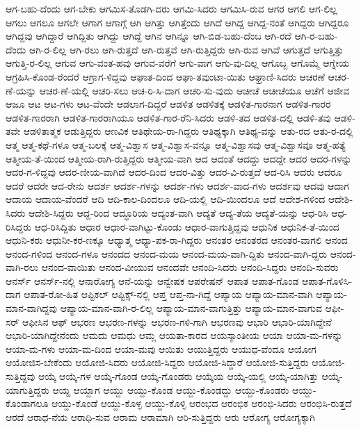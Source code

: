 {ಆಗ-ಬಹು-ದೆಂದು
ಆಗ-ಬೇಕು
ಆಗಮಿಸ-ತೊಡಗಿ-ದರು
ಆಗಮಿ-ಸಿದರು
ಆಗಮಿಸಿ-ರುವ
ಆಗರ
ಆಗಲಿ
ಆಗ-ಲಿಲ್ಲ
ಆಗಲು
ಆಗಲೂ
ಆಗಲೇ
ಆಗಾಗ
ಆಗಾಗ್ಗೆ
ಆಗಿ
ಆಗಿತ್ತು
ಆಗಿತ್ತೆಂದು
ಆಗಿದೆ
ಆಗಿದ್ದ
ಆಗಿದ್ದ-ನಂತೆ
ಆಗಿದ್ದರು
ಆಗಿದ್ದರೂ
ಆಗಿದ್ದವು
ಆಗಿದ್ದಾರೆ
ಆಗಿದ್ದಿತು
ಆಗಿದ್ದು
ಆಗಿದ್ದೆ
ಆಗಿನ
ಆಗಿನ್ನೂ
ಆಗಿ-ಬಿಡ-ಬಹು-ದೆಂಬ
ಆಗಿ-ರದೆ
ಆಗಿ-ರ-ಬಹು-ದೆಂದು
ಆಗಿ-ರ-ಲಿಲ್ಲ
ಆಗಿ-ರಲು
ಆಗಿ-ರುತ್ತದೆ
ಆಗಿ-ರುತ್ತವೆ
ಆಗಿ-ರುತ್ತಿದ್ದರು
ಆಗಿ-ರುವ
ಆಗಿವೆ
ಆಗುತ್ತದೆ
ಆಗುತ್ತಿತ್ತು
ಆಗುತ್ತಿ-ರ-ಲಿಲ್ಲ
ಆಗುವ
ಆಗು-ವಂತ-ಹವು
ಆಗುವ-ವರೆಗೆ
ಆಗು-ವಾಗ
ಆಗು-ವು-ದಿಲ್ಲ
ಆಗೊಬ್ಬ
ಆಗೊಮ್ಮೆ
ಆಗ್ನೇಯ
ಆಗ್ರಹಿಸಿ-ಕೊಂಡ-ರೆಂದರೆ
ಆಗ್ರಾಗ-ಳಿದ್ದವು
ಆಘಾತ-ದಿಂದ
ಆಘಾ-ತವುಂಟಾ-ಯಿತು
ಆಘ್ರಾಣಿ-ಸಿದರು
ಆಚರಣೆ
ಆಚರ-ಣೆ-ಯನ್ನು
ಆಚರ-ಣೆ-ಯಲ್ಲಿ
ಆಚರಿ-ಸಲು
ಆಚ-ರಿ-ಸಿ-ದಾಗ
ಆಚರಿ-ಸು-ವುದು
ಆಚೀಚೆ
ಆಚೀಚೆಯೂ
ಆಚೆಗೆ
ಆಜೀವ
ಆಜೂ
ಆಟ
ಆಟ-ಗಳು
ಆಟ-ವೆಂದೇ
ಆಡಲಾಗ-ದಿದ್ದರೆ
ಆಡಳಿತ
ಆಡಳಿತಕ್ಕೆ
ಆಡಳಿತ-ಗಾರನಾಗ
ಆಡಳಿತ-ಗಾರರ
ಆಡಳಿತ-ಗಾರರಾಗಿ
ಆಡಳಿತ-ಗಾರರಾಗಿಯೂ
ಆಡಳಿತ-ಗಾರ-ರೆನಿ-ಸಿದರು
ಆಡಳಿ-ತದ
ಆಡಳಿತ-ದಲ್ಲಿ
ಆಡಳಿ-ತವು
ಆಡಳಿ-ತವೇ
ಆಡಳಿತಾತ್ಮಕ
ಆಡುತ್ತಿದ್ದರು
ಆಣವಿಕ
ಆತಿಥೇಯ-ರಾ-ಗಿದ್ದರು
ಆತಿಥ್ಯಕ್ಕಾಗಿ
ಆತಿಥ್ಯ-ವನ್ನು
ಆತು-ರದ
ಆತು-ರ-ದಲ್ಲಿ
ಆತ್ಮ
ಆತ್ಮ-ಕಥೆ-ಗಳೂ
ಆತ್ಮ-ಬಲಕ್ಕೆ
ಆತ್ಮ-ವಿಶ್ವಾಸ
ಆತ್ಮ-ವಿಶ್ವಾಸ-ವನ್ನೂ
ಆತ್ಮ-ವಿಶ್ವಾಸವು
ಆತ್ಮ-ವಿಶ್ವಾಸವೂ
ಆತ್ಮ-ಹತ್ಯೆ
ಆತ್ಮೀಯ-ತೆ-ಯಿಂದ
ಆತ್ಮೀಯ-ರಾಗಿ-ರುತ್ತಿದ್ದರು
ಆತ್ಮೀಯ-ವಾಗಿ
ಆದ
ಆದಂತೆ
ಆದದ್ದು
ಆದದ್ದೇ
ಆದರ
ಆದರ-ಗಳನ್ನು
ಆದರ-ಗ-ಳಿದ್ದವು
ಆದರ-ಣೀಯ-ವಾಗಿದೆ
ಆದರ-ದಿಂದ
ಆದರ-ವಿತ್ತು
ಆದರ-ವಿ-ರುತ್ತದೆ
ಆದ-ರಿಸಿ
ಆದರು
ಆದರೂ
ಆದರೆ
ಆದರೇ
ಆದ-ರೇನು
ಆದರ್ಶ
ಆದರ್ಶ-ಗಳನ್ನು
ಆದರ್ಶ-ಗಳು
ಆದರ್ಶ-ವಾದ-ಗಳು
ಆದರ್ಶವು
ಆದವು
ಆದಾಗ
ಆದಾಯ
ಆದಾಯ-ವೆಂದರೆ
ಆದಿ
ಆದಿ-ಕಾಲ-ದಿಂದಲೂ
ಆದಿ-ಯಲ್ಲಿ
ಆದಿ-ಯಿಂದಲೂ
ಆದೆ
ಆದೇಶ-ಗಳಿಂದ
ಆದೇಶಿ-ಸಿದರು
ಆದೇಶಿ-ಸಿದ್ದರು
ಆದ್ದ-ರಿಂದ
ಆದ್ಧೂರಿಯ
ಆದ್ಯಂತ-ವಾಗಿ
ಆದ್ಯತೆ
ಆದ್ಯ-ತೆಯ
ಆದ್ಯತೆ-ಯನ್ನು
ಆಧ-ರಿಸಿ
ಆಧ-ರಿಸಿದ್ದರು
ಆಧ-ರಿಸಿದ್ದಿತು
ಆಧಾರ
ಆಧಾರ-ವಾಗಿಟ್ಟು-ಕೊಂಡು
ಆಧಾರ-ವಾಗುತ್ತಿದ್ದವು
ಆಧುನಿಕ
ಆಧುನಿಕ-ತೆ-ಯಿಂದ
ಆಧುನಿ-ಕರು
ಆಧುನೀ-ಕರ-ಣಕ್ಕೂ
ಆಧ್ಯಾತ್ಮ
ಆಧ್ಯಾ-ಪಕ-ರಾ-ಗಿದ್ದರು
ಆನಂತರ
ಆನಂತರದ
ಆನಂತರ-ವಾಗಲಿ
ಆನಂದ
ಆನಂದ-ಗಳಿಂದ
ಆನಂದ-ಗಳೂ
ಆನಂದದ
ಆನಂದ-ಮಯ
ಆನಂದ-ಮಯ-ವಾಗಿ-ದ್ದಿತು
ಆನಂದ-ವಾಗಿ-ದ್ದರು
ಆನಂದ-ವಾಗಿ-ರಲು
ಆನಂದ-ವಾಯಿತು
ಆನಂದ-ವೀಯುವ
ಆನಂದವೇ
ಆನಂದಿ-ಸಿದರು
ಆನಂದಿ-ಸಿದ್ದರು
ಆನಂದಿ-ಸುವರು
ಆನರ್ಸ್
ಆನರ್ಸ್-ನಲ್ಲಿ
ಆನಾರೋಗ್ಯ
ಆನೆ-ಯನ್ನು
ಆನ್ವೇಷಕ
ಆಪರೇಷನ್
ಆಪಾತ
ಆಪಾತ-ಗೊಂಡ
ಆಪಾತ-ಗೊಳಿಸಿ-ದಾಗ
ಆಪಾತ-ರೋ-ಹಿತ
ಆಪ್ಟಿಕಲ್
ಆಪ್ಟಿಕ್ಸ್-ನಲ್ಲಿ
ಆಪ್ತ
ಆಪ್ತ-ನಾ-ಗಿದ್ದೆ
ಆಪ್ಯಾಯ
ಆಪ್ಯಾಯ-ಮಾನ-ವಾಗಿ
ಆಪ್ಯಾಯ-ಮಾನ-ವಾಗಿದ್ದವು
ಆಪ್ಯಾಯ-ಮಾನ-ವಾಗಿ-ರ-ಲಿಲ್ಲ
ಆಪ್ಯಾಯ-ಮಾನ-ವಾಗುತ್ತಿತ್ತು
ಆಪ್ಯಾಯ-ಮಾನ-ವಾಗುವ
ಆಫೀ-ಸರ್
ಆಫೀಸಿನ
ಆಫ್
ಆಭರಣ
ಆಭರಣ-ಗಳನ್ನು
ಆಭರಣ-ಗಳಿ-ಗಾಗಿ
ಆಭರಣವು
ಆಭಾರಿ
ಆಭಾರಿ-ಯಾಗಿದ್ದೇನೆ
ಆಭಾರಿ-ಯಾಗಿದ್ದೇನೆಂದು
ಆಮದು
ಆಮಧು
ಆಮ್ಲ
ಆಯತಾ-ಕಾರದ
ಆಯಸ್ಕಾಂತೀಯ
ಆಯಾ
ಆಯಾ-ಮ-ಗಳನ್ನು
ಆಯಾ-ಮ-ಗಳು
ಆಯಾ-ಮ-ದಿಂದ
ಆಯಾ-ಮವು
ಆಯಿತು
ಆಯುತ್ತಿದ್ದರು
ಆಯುಧ-ವೆಂದೂ
ಆಯೋಗ
ಆಯೋಜಿಸ-ಬೇಕೆಂದು
ಆಯೋಜಿ-ಸಿದರು
ಆಯೋಜಿ-ಸಿದ್ದರು
ಆಯೋಜಿ-ಸಿದ್ದಾರೆ
ಆಯೋಜಿ-ಸುತ್ತಿದ್ದರು
ಆಯೋಜಿ-ಸುತ್ತಿದ್ದವು
ಆಯ್ಕೆ
ಆಯ್ಕೆ-ಗಳ
ಆಯ್ಕೆ-ಗೊಂಡ
ಆಯ್ಕೆ-ಗೊಂಡರು
ಆಯ್ಕೆಯ
ಆಯ್ಕೆ-ಯಲ್ಲಿ
ಆಯ್ಕೆ-ಯಾಗಿತ್ತು
ಆಯ್ಕೆ-ಯಾಗುತ್ತಿದ್ದರು
ಆಯ್ದ
ಆಯ್ದಾಗ
ಆಯ್ದು
ಆಯ್ದು-ಕೊಂಡ
ಆಯ್ದು-ಕೊಂಡದ್ದು
ಆಯ್ದು-ಕೊಂಡರು
ಆಯ್ದು-ಕೊಂಡಾಗಲೂ
ಆಯ್ದು-ಕೊಂಡೆ
ಆಯ್ದು-ಕೊಳ್ಳ
ಆಯ್ದು-ಕೊಳ್ಳಿ
ಆರಂಭದ
ಆರಂಭಿಕ
ಆರಂಭಿ-ಸಿದರು
ಆರಂಭಿಸಿ-ರುತ್ತದೆ
ಆರದೆ
ಆರಾಧ-ನೆಯ
ಆರಾಧಿ-ಸುವ
ಆರಾಮ
ಆರಾಮಾಗಿ
ಆರಿ-ಸುತ್ತಿದ್ದರು
ಆರು
ಆರೋಗ್ಯ
ಆರೋಗ್ಯಕ್ಕಾಗಿ
}
